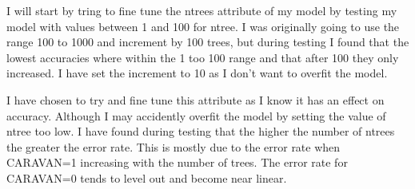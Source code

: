 \documentclass{article}\usepackage[]{graphicx}\usepackage[]{color}
\begin{document}
I will start by tring to fine tune the ntrees attribute of my model by testing my model with values between 1 and 100 for ntree. I was originally going to use the range 100 to 1000 and increment by 100 trees, but during testing I found that the lowest accuracies where within the 1 too 100 range and that after 100 they only increased. I have set the increment to 10 as I don't want to overfit the model. 

I have chosen to try and fine tune this attribute as I know it has an effect on accuracy. Although I may accidently overfit the model by setting the value of ntree too low. I have found during testing that the higher the number of ntrees the greater the error rate. This is mostly due to the error rate when CARAVAN=1 increasing with the number of trees. The error rate for CARAVAN=0 tends to level out and become near linear. 
\end{document}
